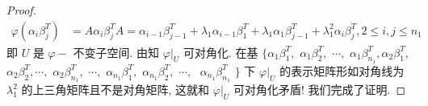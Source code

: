 \documentclass[../../main.tex]{subfiles}
\begin{document}
\begin{proof}
\begin{align*}
\varphi(\alpha_i \beta_j^T) &= A\alpha_i \beta_j^T A = \alpha_{i - 1} \beta_{j - 1}^T + \lambda_1 \alpha_{i - 1} \beta_1^T + \lambda_1 \alpha_1 \beta_{j - 1}^T + \lambda_1^2 \alpha_i \beta_j^T, 2 \leqslant  i, j \leqslant  n_1
\end{align*}
即 $U$ 是 $\varphi-$ 不变子空间. 由知 $\varphi|_U$ 可对角化.
在基 $\{$$\alpha_1 \beta_1^T,$ $ \alpha_1 \beta_2^T, $ $\cdots,$ $ \alpha_1 \beta_{n_1}^T,$$  \alpha_2 \beta_1^T, $ $\alpha_2 \beta_2^T, $$\cdots, $ $\alpha_2 \beta_{n_1}^T,$ $ \cdots,$ $ \alpha_{n_1} \beta_1^T,$ $ \alpha_{n_1} \beta_2^T,$ $ \cdots,$ $ $ $\alpha_{n_1} \beta_{n_1}^T$ $\}$ 下 $\varphi|_U$ 的表示矩阵形如对角线为 $\lambda_1^2$ 的上三角矩阵且不是对角矩阵, 这就和 $\varphi|_U$ 可对角化矛盾!
我们完成了证明.

\end{proof}
\end{document}
